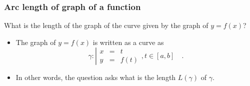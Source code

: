 
\begin{frame}
\frametitle{Arc length of graph of a function}
\begin{question}
What is the length of the graph of the curve given by the graph of $y=f(x)$?
\end{question}
\begin{itemize}
\item<2-> The graph of $y=f(x)$ is written as a curve as 
\[
\gamma:\left|
\begin{array}{rcl}
x&=&t\\
y&=&f(t) 
\end{array}\right.,t\in [a,b]\quad .
\]
\item<3-> In other words, the question asks what is the length $L(\gamma)$ of $\gamma$. 
\end{itemize}

\end{frame}
